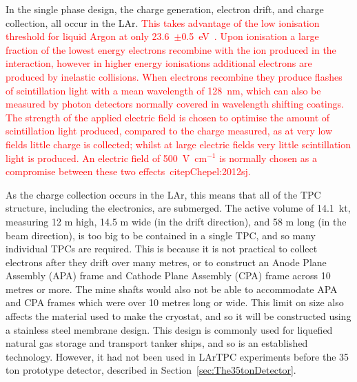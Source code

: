 In the single phase design, the charge generation, electron drift, and charge collection, all occur in the LAr. \textcolor{red}{This takes advantage of the low ionisation threshold for liquid Argon at only 23.6~$\pm$0.5~eV~\citep{Chepel:2012sj}. Upon ionisation a large fraction of the lowest energy electrons recombine with the ion produced in the interaction, however in higher energy ionisations additional electrons are produced by inelastic collisions. When electrons recombine they produce flashes of scintillation light with a mean wavelength of 128~nm, which can also be measured by photon detectors normally covered in wavelength shifting coatings. The strength of the applied electric field is chosen to optimise the amount of scintillation light produced, compared to the charge measured, as at very low fields little charge is collected; whilst at large electric fields very little scintillation light is produced. An electric field of 500~V~cm$^{-1}$ is normally chosen as a compromise between these two effects~citep{Chepel:2012sj}.}

As the charge collection occurs in the LAr, this means that all of the TPC structure, including the electronics, are submerged. The active volume of 14.1~kt, measuring 12 m high, 14.5 m wide (in the drift direction), and 58 m long (in the beam direction), is too big to be contained in a single TPC, and so many individual TPCs are required. This is because it is not practical to collect electrons after they drift over many metres, or to construct an Anode Plane Assembly (APA) frame and Cathode Plane Assembly (CPA) frame across 10 metres or more. The mine shafts would also not be able to accommodate APA and CPA frames which were over 10 metres long or wide. This limit on size also affects the material used to make the cryostat, and so it will be constructed using a stainless steel membrane design. This design is commonly used for liquefied natural gas storage and transport tanker ships, and so is an established technology. However, it had not been used in LArTPC experiments before the 35 ton prototype detector, described in Section~\ref{sec:The35tonDetector}. \\

